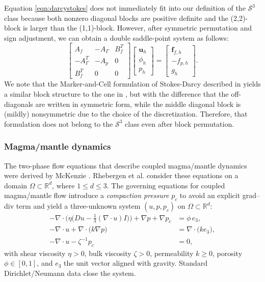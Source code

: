 \documentclass{article}
\newcommand{\st}{\mathcal{S}^3}
\begin{document}
Equation \eqref{eqn:darcystokes} does not immediately fit into our definition of the $\st$ class because both nonzero diagonal blocks are positive definite and the (2,2)-block is larger than the (1,1)-block. However, after symmetric permutation and sign adjustment, we can obtain a double saddle-point system as follows:
\[
\begin{bmatrix}
    A_f & -A_{\Gamma} & B_f^T \\
    -A_{\Gamma}^T & -A_p & 0 \\
    B_f^T & 0 & 0
\end{bmatrix}\begin{bmatrix}
    \mathbf{u}_h \\
    \phi_h \\
    p_h
\end{bmatrix} = \begin{bmatrix}
    \mathbf{f}_{f,h} \\
    -f_{p,h} \\
    g_h
\end{bmatrix}.
\]
We note that the Marker-and-Cell formulation of Stokes-Darcy described in \cite{g26, gh23} yields a similar block structure to the one in \cite{cmx09,cls16}, but with the difference that the off-diagonals are written in symmetric form, while the middle diagonal block is (mildly) nonsymmetric due to the choice of the discretization. Therefore, that formulation does not belong to the $\st$ class even after block permutation.


\subsubsection{Magma/mantle dynamics} 
The two-phase flow equations that describe coupled magma/mantle dynamics
were derived by McKenzie \cite{mckenzie1984generation}.
Rhebergen et al. \cite{rwwk15} consider these equations on a domain  $\Omega \subset \mathbb{R}^d$, where $1 \le d \le 3$. The governing equations for coupled magma/mantle flow introduce a \emph{compaction pressure} $p_c$ to avoid an explicit grad--div term and yield a three-unknown system $(u,p,p_c)$ on $\Omega\subset\mathbb{R}^d$:
\begin{align*}
-\nabla \cdot \Big(\eta\big(Du-\tfrac{1}{3}(\nabla\!\cdot u)I\big)\Big) + \nabla p + \nabla p_c &= \phi\,e_3,\\
-\nabla \cdot u + \nabla \cdot \big(k \nabla p\big) &= \nabla \cdot \big(k e_3\big),\\
-\nabla \cdot u - \zeta^{-1}p_c &= 0,
\end{align*}
with shear viscosity $\eta>0$, bulk viscosity $\zeta>0$, permeability $k\ge 0$, porosity $\phi\in[0,1]$, and $e_3$ the unit vector aligned with gravity. Standard Dirichlet/Neumann data close the system.
\end{document}
